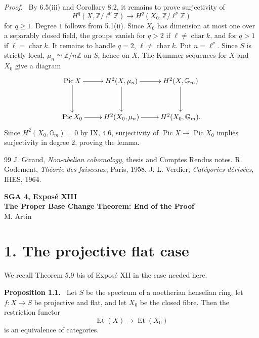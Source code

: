 \documentclass[12pt]{article}
\newcommand{\Zz}{\mathbb{Z}}
\newcommand{\Gm}{\mathbb{G}_m}
\newcommand{\Pic}{\operatorname{Pic}}
\newcommand{\Et}{\operatorname{Et}}
\newenvironment{statement}[1]{\par\medskip\noindent\textbf{#1.}\ }{\par\medskip}
\newenvironment{prooftext}[1][Proof]{\par\noindent\emph{#1.}\ }{\par\medskip}
\begin{document}
\begin{prooftext}
By 6.5(iii) and Corollary 8.2, it remains to prove surjectivity of
\[
H^q(X,\Zz/\ell^\nu\Zz)\longrightarrow H^q(X_0,\Zz/\ell^\nu\Zz)
\]
for \(q\ge1\). Degree \(1\) follows from 5.1(ii). Since \(X_0\) has dimension at most one over a separably closed field, the groups vanish for \(q>2\) if \(\ell\ne\operatorname{char}k\), and for \(q>1\) if \(\ell=\operatorname{char}k\). It remains to handle \(q=2\), \(\ell\ne\operatorname{char}k\). Put \(n=\ell^\nu\). Since \(S\) is strictly local, \(\mu_n\simeq\Zz/n\Zz\) on \(S\), hence on \(X\). The Kummer sequences for \(X\) and \(X_0\) give a diagram
\[
\xymatrix@R=1.2cm{
\Pic X\ar[r]\ar[d]&H^2(X,\mu_n)\ar[r]\ar[d]&H^2(X,\Gm)\ar[d]\\
\Pic X_0\ar[r]&H^2(X_0,\mu_n)\ar[r]&H^2(X_0,\Gm).
}
\]
Since \(H^2(X_0,\Gm)=0\) by IX, 4.6, surjectivity of \(\Pic X\to\Pic X_0\) implies surjectivity in degree \(2\), proving the lemma.
\end{prooftext}

\begin{thebibliography}{99}
 J. Giraud, \emph{Non-abelian cohomology}, thesis and Comptes Rendus notes.
 R. Godement, \emph{Th\'eorie des faisceaux}, Paris, 1958.
 J.-L. Verdier, \emph{Cat\'egories d\'eriv\'ees}, IHES, 1964.
\end{thebibliography}

\clearpage
\begin{center}
{\Large \textbf{SGA 4, Expos\'e XIII}}\\[0.35em]
{\large \textbf{The Proper Base Change Theorem: End of the Proof}}\\[0.25em]
{\normalsize M. Artin}
\end{center}

\section*{1. The projective flat case}

We recall Theorem 5.9 bis of Expos\'e XII in the case needed here.

\begin{statement}{Proposition 1.1}
Let \(S\) be the spectrum of a noetherian henselian ring, let \(f:X\to S\) be projective and flat, and let \(X_0\) be the closed fibre. Then the restriction functor
\[
\Et(X)\longrightarrow \Et(X_0)
\]
is an equivalence of categories.
\end{statement}
\end{document}
